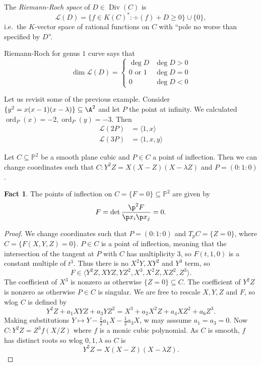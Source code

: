 \documentclass[a4paper]{article}
\theoremstyle{definition}
\newtheorem*{fact}{Fact}
\renewcommand*{\P}{\mathbb{P}}
\DeclareMathOperator{\ord}{ord}
\DeclareMathOperator{\Div}{Div} %
\begin{document}
The \emph{Riemann-Roch space} of \(D \in \Div(C)\) is
\[
  \mathcal L(D) = \{f \in K(C)^*: \div(f) + D \geq 0\} \cup \{0\},
\]
i.e.\ the \(K\)-vector space of rational functions on \(C\) with ``pole no worse than specified by \(D\)''.

Riemann-Roch for genus \(1\) curve says that
\[
  \dim \mathcal L(D) =
  \begin{cases}
    \deg D & \deg D > 0 \\
    0 \text{ or } 1 & \deg D = 0 \\
    0 & \deg D < 0 
  \end{cases}
\]

\begin{eg}
  Let us revisit some of the previous example. Consider \(\{y^2 = x(x - 1)(x - \lambda)\} \subseteq \A^2\) and let \(P\) the point at infinity. We calculated \(\ord_P(x) = -2, \ord_P(y) = -3\). Then
  \begin{align*}
    \mathcal L(2P) &= \langle 1, x \rangle \\
    \mathcal L(3P) &= \langle 1, x, y \rangle
  \end{align*}
\end{eg}

\begin{proposition}
  Let \(C \subseteq \P^2\) be a smooth plane cubic and \(P \in C\) a point of inflection. Then we can change coordinates such that \(C: Y^2Z = X(X - Z)(X - \lambda Z)\) and \(P = (0: 1: 0)\).
\end{proposition}

\begin{fact}
  The points of inflection on \(C = \{F = 0\} \subseteq \P^2\) are given by
  \[
    F = \det \frac{\p^2 F}{\p x_i \p x_j} = 0.
  \]
\end{fact}

\begin{proof}
  We change coordinates such that \(P = (0 : 1 : 0)\) and \(T_pC = \{Z = 0\}\), where \(C = \{F(X, Y, Z) = 0\}\). \(P \in C\) is a point of inflection, meaning that the intersection of the tangent at \(P\) with \(C\) has multiplicity \(3\), so \(F(t, 1, 0)\) is a constant multiple of \(t^3\). Thus there is no \(X^2Y, XY^2\) and \(Y^3\) term, so
  \[
    F \in \langle Y^2Z, XYZ, YZ^2, X^3, X^2Z, XZ^2, Z^3 \rangle.
  \]
  The coefficient of \(X^3\) is nonzero as otherwise \(\{Z = 0\} \subseteq C\). The coefficient of \(Y^2Z\) is nonzero as otherwise \(P \in C\) is singular. We are free to rescale \(X, Y, Z\) and \(F\), so wlog \(C\) is defined by
  \[
    Y^2Z + a_1 XYZ + a_3 YZ^2 = X^3 + a_2 X^2Z + a_4 XZ^2 + a_6 Z^3.
  \]
  Making substitutions \(Y \mapsto Y - \frac{1}{2} a_1X - \frac{1}{2} a_3 X\), w may asssume \(a_1 = a_3 = 0\). Now \(C: Y^2Z = Z^3 f(X/Z)\) where \(f\) is a monic cubic polynomial. As \(C\) is smooth, \(f\) has distinct roots so wlog \(0, 1, \lambda\) so \(C\) is
  \[
    Y^2Z = X(X - Z)(X - \lambda Z).
  \]
\end{proof}
\end{document}
